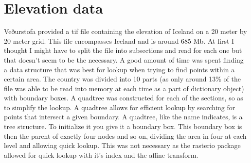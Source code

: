 \section{Elevation data}
Veðurstofa provided a tif file containing the elevation of Iceland on a 20 meter by 20 meter grid. This file encompasses Iceland and is around 685 Mb. At first I thought I might have to split the file into subsections and read for each one but that doesn't seem to be the necessary. A good amount of time was spent finding a data structure that was best for lookup when trying to find points within a certain area. The country was divided into 10 parts (as only around 13\% of the file was able to be read into memory at each time as a part of dictionary object) with boundary boxes. A quadtree was constructed for each of the sections, so as to simplify the lookup. A quadtree allows for efficient lookup by searching for points that intersect a given boundary. A quadtree, like the name indicates, is a tree structure. To initialize it you give it a boundary box. This boundary box is then the parent of exactly four nodes and so on, dividing the area in four at each level and allowing quick lookup. This was not necessary as the rasterio package allowed for quick lookup with it's index and the affine transform. 